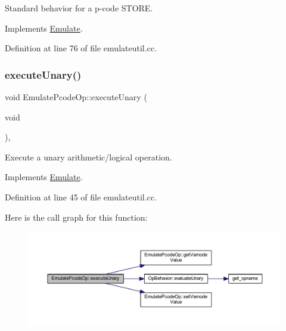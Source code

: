 Standard behavior for a p-\/code S\+T\+O\+RE. 



Implements \mbox{\hyperlink{class_emulate_a634f0261bf49be73e7d31a2baf9f6e4d}{Emulate}}.



Definition at line 76 of file emulateutil.\+cc.

\mbox{\label{class_emulate_pcode_op_acdcfb1ee505eb8eeac882ddef564f18e}} 
\subsubsection{\texorpdfstring{executeUnary()}{executeUnary()}}
{\footnotesize\ttfamily void Emulate\+Pcode\+Op\+::execute\+Unary (\begin{DoxyParamCaption}\item[{void}]{ }\end{DoxyParamCaption})\hspace{0.3cm}{\ttfamily [protected]}, {\ttfamily [virtual]}}



Execute a unary arithmetic/logical operation. 



Implements \mbox{\hyperlink{class_emulate_a95111238fb3061b23db2e94ec280b34f}{Emulate}}.



Definition at line 45 of file emulateutil.\+cc.

Here is the call graph for this function\+:
\nopagebreak
\begin{figure}[H]
\begin{center}
\leavevmode
\includegraphics[width=350pt]{class_emulate_pcode_op_acdcfb1ee505eb8eeac882ddef564f18e_cgraph}
\end{center}
\end{figure}
\mbox{\label{class_emulate_pcode_op_a55356dba15ee255dc6d9a7d2dd3832c0}} 
